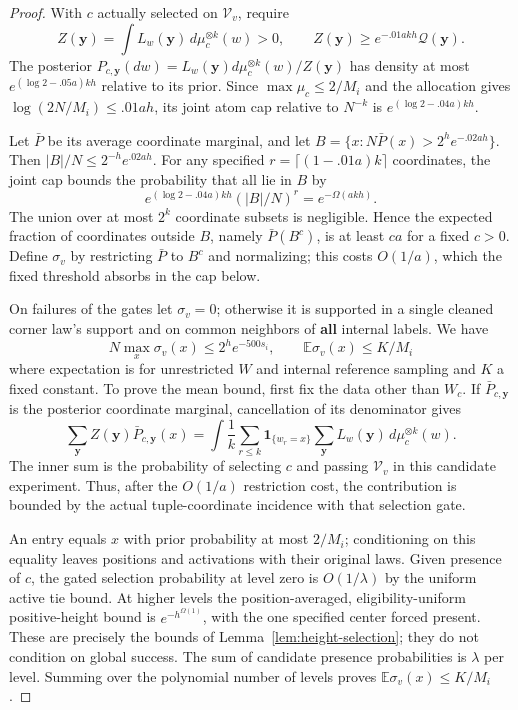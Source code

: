 \begin{proof}
With \(c\) actually selected on \(\mathcal V_v\), require
\[
 Z(\boldsymbol y)=\int L_w(\boldsymbol y)\,d\mu_c^{\otimes k}(w)>0,
 \qquad Z(\boldsymbol y)\ge e^{-.01akh}\mathcal Q(\boldsymbol y).
\]
The posterior \(P_{c,\boldsymbol y}(dw)=L_w(\boldsymbol y)d\mu_c^{\otimes k}(w)/Z(\boldsymbol y)\) has density at most \(e^{(\log2-.05a)kh}\) relative to its prior. Since \(\max\mu_c\le2/M_i\) and the allocation gives \(\log(2N/M_i)\le .01ah\), its joint atom cap relative to \(N^{-k}\) is \(e^{(\log2-.04a)kh}\).

Let \(\bar P\) be its average coordinate marginal, and let
\(B=\{x:N\bar P(x)>2^he^{-.02ah}\}\). Then \(|B|/N\le2^{-h}e^{.02ah}\). For any specified \(r=\lceil(1-.01a)k\rceil\) coordinates, the joint cap bounds the probability that all lie in \(B\) by
\[
 e^{(\log2-.04a)kh}(|B|/N)^r=e^{-\Omega(akh)}.
\]
The union over at most \(2^k\) coordinate subsets is negligible. Hence the expected fraction of coordinates outside \(B\), namely \(\bar P(B^c)\), is at least \(c a\) for a fixed \(c>0\). Define \(\sigma_v\) by restricting \(\bar P\) to \(B^c\) and normalizing; this costs \(O(1/a)\), which the fixed threshold absorbs in the cap below.

On failures of the gates let \(\sigma_v=0\); otherwise it is supported in a single cleaned corner law's support and on common neighbors of \textbf{all} internal labels. We have
\begin{equation}
 N\max_x\sigma_v(x)\le 2^h e^{-500s_i},\qquad
 \mathbb E\sigma_v(x)\le K/M_i
 \label{eq:source-14}
\end{equation}
where expectation is for unrestricted \(W\) and internal reference sampling and \(K\) a fixed constant. To prove the mean bound, first fix the data other than \(W_c\). If \(\bar P_{c,\boldsymbol y}\) is the posterior coordinate marginal, cancellation of its denominator gives
\[
 \sum_{\boldsymbol y} Z(\boldsymbol y)\bar P_{c,\boldsymbol y}(x)
 =\int \frac1k\sum_{r\le k}\mathbf1_{\{w_r=x\}}
       \sum_{\boldsymbol y}L_w(\boldsymbol y)\,d\mu_c^{\otimes k}(w).
\]
The inner sum is the probability of selecting \(c\) and passing \(\mathcal V_v\) in this candidate experiment. Thus, after the \(O(1/a)\) restriction cost, the contribution is bounded by the actual tuple-coordinate incidence with that selection gate.

An entry equals \(x\) with prior probability at most \(2/M_i\); conditioning on this equality leaves positions and activations with their original laws. Given presence of \(c\), the gated selection probability at level zero is \(O(1/\lambda)\) by the uniform active tie bound. At higher levels the position-averaged, eligibility-uniform positive-height bound is \(e^{-h^{\Omega(1)}}\), with the one specified center forced present. These are precisely the bounds of Lemma~\ref{lem:height-selection}; they do not condition on global success. The sum of candidate presence probabilities is \(\lambda\) per level. Summing over the polynomial number of levels proves \(\mathbb E\sigma_v(x)\le K/M_i\).


\end{proof}
